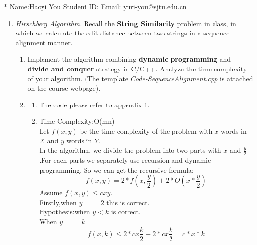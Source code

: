 \documentclass[12pt,a4paper]{article}
\makeatletter
\newtheorem*{solution}{Solution}
\theoremstyle{definition}
\renewenvironment{solution}[1][Solution] {\par\pushQED{\qed}\normalfont\topsep6\p@\@plus6\p@\relax\trivlist\item[\hskip\labelsep\bfseries#1\@addpunct{.}]\ignorespaces}{\popQED\endtrivlist\@endpefalse} \makeatother
\makeatother
\begin{document}
\noindent

\noindent{}
\begin{center}
\footnotesize{\color{blue}$*$ Name:\underline{\quad   Haoyi You  \quad  }\quad Student ID:\underline{ \quad} \quad Email: \underline{\quad yuri-you@sjtu.edu.cn \quad}}
\end{center}

\begin{enumerate}
    \item
    \textit{Hirschberg Algorithm.} Recall the \textbf{String Similarity} problem in class, in which we calculate the edit distance between two strings in a sequence alignment manner.
    \begin{enumerate}
    	\item
    	Implement the algorithm combining \textbf{dynamic programming} and \textbf{divide-and-conquer} strategy in C/C++. Analyze the time complexity of your algorithm. {\color{blue}(The template \emph{Code-SequenceAlignment.cpp} is attached on the course webpage)}.
    	    \begin{solution}
    \begin{enumerate}
       \item The code please refer to appendix 1.
       \item  Time Complexity:O(mn)\\
        Let $f(x,y)$ be the time complexity of the problem with $x$ words in $X$ and $y$ words in $Y$.\\
        In the algorithm, we divide the problem into two parts with $x$ and $\frac{y}{2}$.For each parts we separately use recursion and dynamic programming. So we can get the recursive formula:
        \begin{equation}
            f(x,y)=2*f(x,\frac{y}{2})+2*O(x*\frac{y}{2})
        \end{equation}
        Assume $f(x,y)\le cxy$.\\
        Firstly,when $y==2$ this is correct.\\
        Hypothesis:when $y<k$ is correct.\\
        When $y==k$,
        \begin{equation}
        f(x,k)\le 2*cx\frac{k}{2}+2*cx\frac{k}{2}=c*x*k

\end{equation}
\end{enumerate}
\end{solution}
\end{enumerate}
\end{enumerate}
\end{document}
